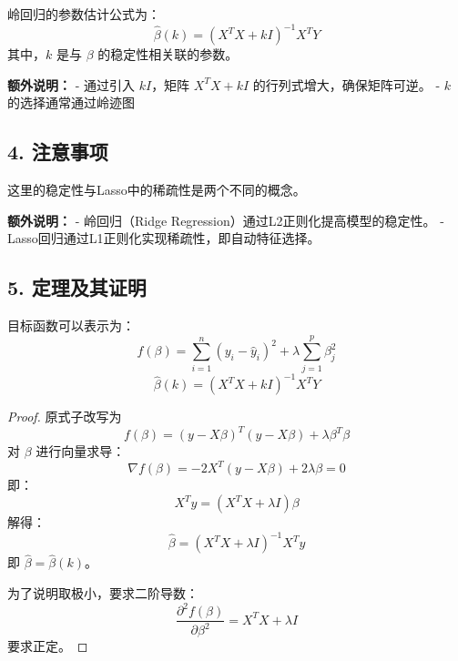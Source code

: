\documentclass[lang=cn,11pt,a4paper]{elegantpaper}
\begin{document}
岭回归的参数估计公式为：
\begin{equation}
\hat{\beta}(k) = (X^T X + k I)^{-1} X^T Y
\end{equation}
其中，\(k\) 是与 \(\beta\) 的稳定性相关联的参数。

\textbf{额外说明：}
- 通过引入 \(k I\)，矩阵 \(X^T X + k I\) 的行列式增大，确保矩阵可逆。
- \(k\) 的选择通常通过岭迹图

\subsection*{4. 注意事项}

这里的稳定性与Lasso中的稀疏性是两个不同的概念。

\textbf{额外说明：}
- 岭回归（Ridge Regression）通过L2正则化提高模型的稳定性。
- Lasso回归通过L1正则化实现稀疏性，即自动特征选择。

\subsection*{5. 定理及其证明}

\begin{theorem}
目标函数可以表示为：
\begin{equation}
f(\beta) = \sum_{i=1}^n (y_i - \hat{y}_i)^2 + \lambda \sum_{j=1}^p \beta_j^2
\end{equation}
\begin{equation}
\hat{\beta}(k) = (X^T X + k I)^{-1} X^T Y
\end{equation}
\end{theorem}

\begin{proof}
原式子改写为
\begin{equation}
f(\beta) = (y - X \beta)^T (y - X \beta) + \lambda \beta^T \beta
\end{equation}
对 \(\beta\) 进行向量求导：
\begin{equation}
\nabla f(\beta) = -2 X^T (y - X \beta) + 2 \lambda \beta = 0
\end{equation}
即：
\begin{equation}
X^T y = (X^T X + \lambda I) \beta
\end{equation}
解得：
\begin{equation}
\hat{\beta} = (X^T X + \lambda I)^{-1} X^T y
\end{equation}
即 \(\hat{\beta} = \hat{\beta}(k)\)。

为了说明取极小，要求二阶导数：
\begin{equation}
\frac{\partial^2 f(\beta)}{\partial \beta^2} = X^T X + \lambda I
\end{equation}
要求正定。
\end{proof}
\end{document}
